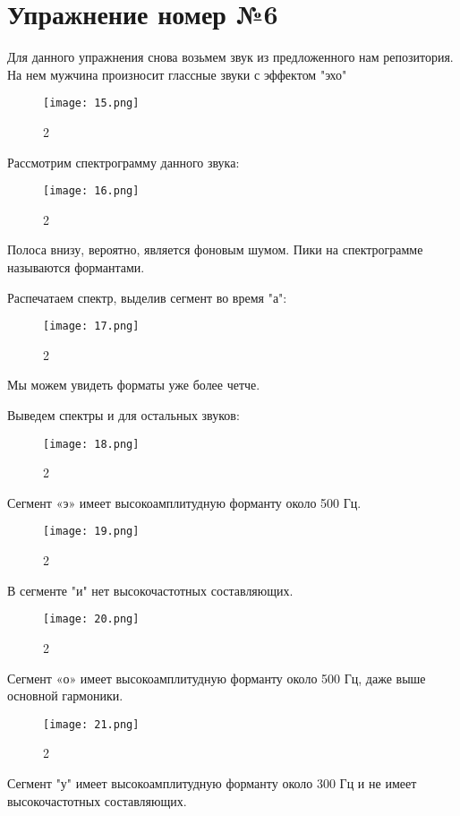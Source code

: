 \documentclass[10pt,a4paper,oneside]{article}
\begin{document}
\section{Упражнение номер №6}

Для данного упражнения снова возьмем звук из предложенного нам репозитория. На нем мужчина произносит глассные звуки с эффектом "эхо"

\begin{figure}[H]
        \centering
        \texttt{[image: 15.png]}
        \caption{2}
        \label{fig:first}
\end{figure}

Рассмотрим спектрограмму данного звука: 

\begin{figure}[H]
        \centering
        \texttt{[image: 16.png]}
        \caption{2}
        \label{fig:first}
\end{figure}

Полоса внизу, вероятно, является фоновым шумом. Пики на спектрограмме называются формантами.

Распечатаем спектр, выделив сегмент во время "а":

\begin{figure}[H]
        \centering
        \texttt{[image: 17.png]}
        \caption{2}
        \label{fig:first}
\end{figure}

Мы можем увидеть форматы уже более четче.

Выведем спектры и для остальных звуков: 

\begin{figure}[H]
        \centering
        \texttt{[image: 18.png]}
        \caption{2}
        \label{fig:first}
\end{figure}

Сегмент «э» имеет высокоамплитудную форманту около 500 Гц.

\begin{figure}[H]
        \centering
        \texttt{[image: 19.png]}
        \caption{2}
        \label{fig:first}
\end{figure}

В сегменте "и" нет высокочастотных составляющих.

\begin{figure}[H]
        \centering
        \texttt{[image: 20.png]}
        \caption{2}
        \label{fig:first}
\end{figure}

Сегмент «о» имеет высокоамплитудную форманту около 500 Гц, даже выше основной гармоники.

\begin{figure}[H]
        \centering
        \texttt{[image: 21.png]}
        \caption{2}
        \label{fig:first}
\end{figure}

Сегмент "у" имеет высокоамплитудную форманту около 300 Гц и не имеет высокочастотных составляющих.
\end{document}
